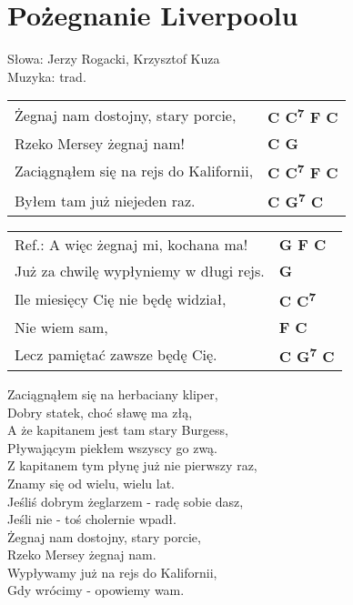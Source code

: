 \section{Pożegnanie Liverpoolu}

Słowa: Jerzy Rogacki, Krzysztof Kuza\\
Muzyka:  trad.

\vspace{2em}
\begin{tabular}{@{}p{7cm}@{}l@{}}
Żegnaj nam dostojny, stary porcie,  & \bfseries   C C\textsuperscript{7} F C \\
Rzeko Mersey żegnaj nam!  & \bfseries   C G \\
Zaciągnąłem się na rejs do Kalifornii,  & \bfseries   C C\textsuperscript{7} F C \\
Byłem tam już niejeden raz.  & \bfseries   C G\textsuperscript{7} C \\
\end{tabular}

\vspace{1em}
\begin{tabular}{@{}p{7cm}@{}l@{}}
Ref.: A więc żegnaj mi, kochana ma!  & \bfseries   G F C \\
Już za chwilę wypłyniemy w długi rejs.  & \bfseries   G \\
Ile miesięcy Cię nie będę widział,  & \bfseries   C C\textsuperscript{7} \\
Nie wiem sam,  & \bfseries   F C \\
Lecz pamiętać zawsze będę Cię.  & \bfseries   C G\textsuperscript{7} C \\
\end{tabular}

\vspace{1em}
Zaciągnąłem się na herbaciany kliper, \\
Dobry statek, choć sławę ma złą, \\
A że kapitanem jest tam stary Burgess, \\
Pływającym piekłem wszyscy go zwą. \\

Z kapitanem tym płynę już nie pierwszy raz, \\
Znamy się od wielu, wielu lat. \\
Jeśliś dobrym żeglarzem - radę sobie dasz, \\
Jeśli nie - toś cholernie wpadł. \\

Żegnaj nam dostojny, stary porcie, \\
Rzeko Mersey żegnaj nam. \\
Wypływamy już na rejs do Kalifornii, \\
Gdy wrócimy - opowiemy wam.